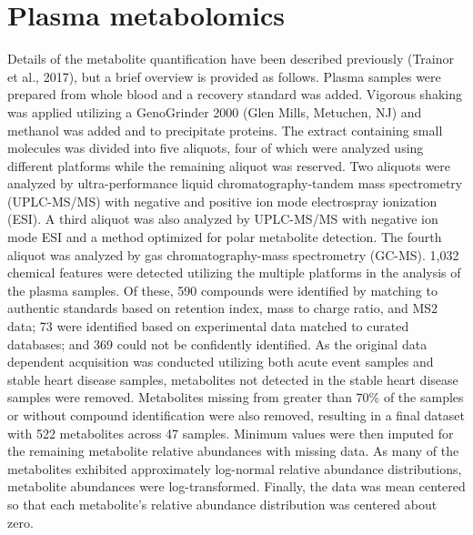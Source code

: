 \section{Plasma metabolomics}
Details of the metabolite quantification have been described previously (Trainor et al., 2017), but a brief overview is provided as follows. Plasma samples were prepared from whole blood and a recovery standard was added. Vigorous shaking was applied utilizing a GenoGrinder 2000 (Glen Mills, Metuchen, NJ) and methanol was added and to precipitate proteins. The extract containing small molecules was divided into five aliquots, four of which were analyzed using different platforms while the remaining aliquot was reserved. Two aliquots were analyzed by ultra-performance liquid chromatography-tandem mass spectrometry (UPLC-MS/MS) with negative and positive ion mode electrospray ionization (ESI). A third aliquot was also analyzed by UPLC-MS/MS with negative ion mode ESI and a method optimized for polar metabolite detection. The fourth aliquot was analyzed by gas chromatography-mass spectrometry (GC-MS). 1,032 chemical features  were detected utilizing the multiple platforms in the analysis of the plasma samples. Of these, 590 compounds were identified by matching to authentic standards based on retention index, mass to charge ratio, and MS2 data; 73 were identified based on experimental data matched to curated databases; and 369 could not be confidently identified. As the original data dependent acquisition was conducted utilizing both acute event samples and stable heart disease samples, metabolites not detected in the stable heart disease samples were removed. Metabolites missing from greater than 70\% of the samples or without compound identification were also removed, resulting in a final dataset with 522 metabolites across 47 samples. Minimum values were then imputed for the remaining metabolite relative abundances with missing data. As many of the metabolites exhibited approximately log-normal relative abundance distributions, metabolite abundances were log-transformed. Finally, the data was mean centered so that each metabolite’s relative abundance distribution was centered about zero.